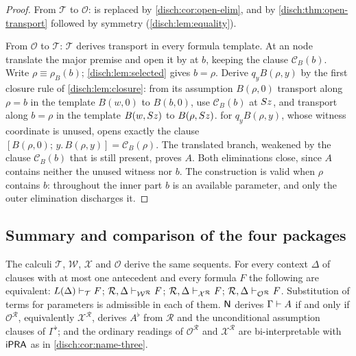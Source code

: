 \begin{proof}
From $\mathcal T$ to $\mathcal O$:  is replaced by
\cref{disch:cor:open-elim}, and  by
\cref{disch:thm:open-transport} followed by symmetry
(\cref{disch:lem:equality}).

From $\mathcal O$ to $\mathcal T$: $\mathcal T$ derives transport in every
formula template. At an  node translate the major premise
and open it by  at $b$, keeping the clause
$\mathcal C_B(b)$. Write $\rho\equiv\rho_B(b)$;
\cref{disch:lem:selected} gives $b=\rho$. Derive $q_yB(\rho,y)$ by the
first closure rule of \cref{disch:lem:closure}: from its assumption
$B(\rho,0)$ transport along $\rho=b$ in the template $B(w,0)$ to $B(b,0)$,
use $\mathcal C_B(b)$ at $S z$, and transport along $b=\rho$ in the
template $B(w,S z)$ to $B(\rho,S z)$.  for
$q_yB(\rho,y)$, whose witness coordinate is unused, opens exactly the
clause $[B(\rho,0);\,y.\,B(\rho,y)]=\mathcal C_B(\rho)$. The translated
branch, weakened by the clause $\mathcal C_B(b)$ that is still present,
proves $A$. Both eliminations close, since $A$ contains neither the unused
witness nor $b$. The construction is valid when $\rho$ contains $b$:
throughout the inner part $b$ is an available parameter, and only the
outer elimination discharges it.
\end{proof}

\subsection{Summary and comparison of the four packages}

\begin{theorem}
\label{disch:thm:inferred}
The calculi $\mathcal T$, $\mathcal W$, $\mathcal X$ and $\mathcal O$
derive the same sequents. For every context $\Delta$ of clauses with at
most one antecedent and every formula $F$ the following are equivalent:
$L(\Delta)\vdash_{\mathcal T}F$;
$\mathcal R,\Delta\vdash_{\mathcal W^{\mathcal R}}F$;
$\mathcal R,\Delta\vdash_{\mathcal X^{\mathcal R}}F$;
$\mathcal R,\Delta\vdash_{\mathcal O^{\mathcal R}}F$. Substitution of
terms for parameters is admissible in each of them. $\mathsf{N}$ derives
$\Gamma\vdash A$ if and only if $\mathcal O^{\mathcal R}$, equivalently
$\mathcal X^{\mathcal R}$, derives $A^{\flat}$ from $\mathcal R$ and the
unconditional assumption clauses of $\Gamma^{\flat}$; and the ordinary
readings of $\mathcal O^{\mathcal R}$ and $\mathcal X^{\mathcal R}$ are
bi-interpretable with $\mathsf{iPRA}$ as in \cref{disch:cor:name-three}.
\end{theorem}

